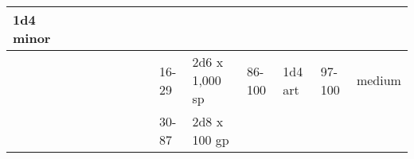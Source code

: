 \begin{longtable}{llllllllllllll}
{\begin{minipage}[t]{0.469in}
1d4 minor\end{minipage}}\\
\hline
\multicolumn{8}{p{1.150in}|}{\begin{minipage}[t]{1.150in}\centering
\end{minipage}} & \multicolumn{1}{|p{0.393in}|}{\begin{minipage}[t]{0.393in}\raggedright
16-29\end{minipage}} & \multicolumn{1}{p{0.469in}|}{\begin{minipage}[t]{0.469in}\raggedright
2d6 x 1,000 sp\end{minipage}} & \multicolumn{1}{p{0.923in}|}{\begin{minipage}[t]{0.923in}\raggedright
86-100\end{minipage}} & \multicolumn{1}{p{0.469in}|}{\begin{minipage}[t]{0.469in}\raggedright
1d4 art\end{minipage}} & \multicolumn{1}{p{0.626in}|}{\begin{minipage}[t]{0.626in}\raggedright
97-100\end{minipage}} & \multicolumn{1}{p{0.469in}|}{\begin{minipage}[t]{0.469in}\centering
1 medium\end{minipage}}\\
\hline
\multicolumn{8}{p{1.150in}|}{\begin{minipage}[t]{1.150in}\centering
\end{minipage}} & \multicolumn{1}{|p{0.393in}|}{\begin{minipage}[t]{0.393in}\raggedright
30-87\end{minipage}} & \multicolumn{1}{p{0.469in}|}{\begin{minipage}[t]{0.469in}\raggedright
2d8 x 100 gp\end{minipage}} & \multicolumn{1}{p{0.923in}|}{\begin{minipage}[t]{0.923in}\raggedright
\end{minipage}} & \multicolumn{1}{p{0.469in}|}{\begin{minipage}[t]{0.469in}\raggedright
\end{minipage}} & \multicolumn{1}{p{0.626in}|}{\begin{minipage}[t]{0.626in}\raggedright
\end{minipage}} & \multicolumn{1}{p{0.469in}|}{\begin{minipage}[t]{0.469in}\centering
\end{minipage}}\\

\end{longtable}
